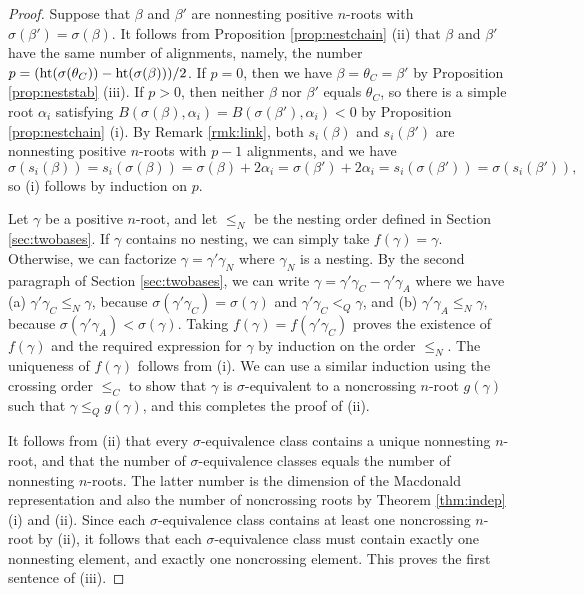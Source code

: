 \documentclass[11pt]{amsart}
\theoremstyle{plain}
\theoremstyle{definition}
\theoremstyle{remark}
\numberwithin{equation}{subsection}
\newcommand{\al}{\alpha}
\newcommand{\be}{\beta}
\newcommand{\Be}{\mathcal B}
\newcommand{\rootht}{\text{\rm ht}}
\begin{document}
\begin{proof}
Suppose that $\be$ and $\be'$ are nonnesting positive $n$-roots with
$\sigma(\be') = \sigma(\be)$. It follows from Proposition \ref{prop:nestchain}
(ii) that $\be$ and $\be'$ have the same number of alignments, namely, the
number $p=(\rootht(\sigma(\theta_C))-\rootht(\sigma(\beta)))/2$. If $p=0$, then
we have $\be=\theta_C=\be'$ by Proposition \ref{prop:neststab} (iii). If $p>0$,
then neither $\be$ nor $\be'$ equals $\theta_C$, so there is a simple root
$\al_i$ satisfying $B(\sigma(\be),\al_i)=B(\sigma(\be'),\al_i)<0$ by Proposition
\ref{prop:nestchain} (i). By Remark \ref{rmk:link}, both $s_i(\be)$ and
$s_i(\be')$ are nonnesting positive $n$-roots with $p-1$ alignments, and we have
\[
    \sigma(s_i(\beta))=s_i(\sigma(\beta))=\sigma(\beta)+2\al_i=\sigma(\beta')+2\al_i=s_i(\sigma(\be'))=\sigma(s_i(\be')),
\] 
so (i) follows by induction on $p$.

Let $\gamma$ be a positive $n$-root, and let $\le_N$ be the nesting order
defined in Section \ref{sec:twobases}.
If $\gamma$ contains no nesting, we can simply take $f(\gamma)=\gamma$.
Otherwise, we can factorize $\gamma=\gamma'\gamma_N$ where $\gamma_N$ is a
nesting. By the second paragraph of Section \ref{sec:twobases}, we can write
$\gamma=\gamma'\gamma_C-\gamma'\gamma_A$ where we have (a) $\gamma'\gamma_C\le
_N\gamma$, because $\sigma(\gamma'\gamma_C)=\sigma(\gamma)$ and $
\gamma'\gamma_C<_Q \gamma$, and (b) $\gamma'\gamma_A\le _N\gamma$, because
$\sigma(\gamma'\gamma_A)<\sigma(\gamma)$. Taking $f(\gamma)=f(\gamma'\gamma_C)$
proves the existence of $f(\gamma)$ and the required expression for $\gamma$ by
induction on the order $\le_N$.  The uniqueness of $f(\gamma)$ follows from (i).
We can use a similar induction using the crossing order $\le_C$ to show that
$\gamma$ is $\sigma$-equivalent to a noncrossing $n$-root $g(\gamma)$ such that
$\gamma \leq_Q g(\gamma)$, and this completes the proof of (ii).

It follows from (ii) that every $\sigma$-equivalence class contains a unique
nonnesting $n$-root, and that the number of $\sigma$-equivalence classes equals
the number of nonnesting $n$-roots. The latter number is the dimension of the
Macdonald representation and also the number of noncrossing roots by Theorem
\ref{thm:indep} (i) and (ii).  Since each $\sigma$-equivalence class contains at
least one noncrossing $n$-root by (ii), it follows that each
$\sigma$-equivalence class must contain exactly one nonnesting element, and
exactly one noncrossing element. This proves the first sentence of (iii).


\end{proof}
\end{document}
